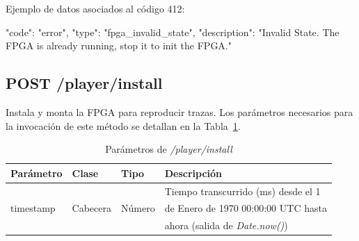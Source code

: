 \begin{itemize}
{\begin{minipage}{\textwidth}
Ejemplo de datos asociados al código 412:

\begin{code}[language=json]
{
  "code": "error",
  "type": "fpga_invalid_state",
  "description": "Invalid State. The FPGA is already running, stop it to init the FPGA."
}
\end{code}
\end{minipage}
}

\end{itemize}

%
%
\subsection{POST /player/install}
Instala y monta la \gls{FPGA} para reproducir \glspl{traza}.
Los parámetros necesarios para la invocación de este método se detallan en la Tabla~\ref{extra:api:playerinstall:invocacion}.

\begin{table}[H]
\centering
\begin{tabular}{|l|l|l|l|}
\hline
\rowcolor[HTML]{F5F5F5}
\textbf{Parámetro}  & \textbf{Clase} & \textbf{Tipo} & \textbf{Descripción}                  \\ \hline
                    &                &               & Tiempo transcurrido (ms) desde el 1   \\
timestamp           & Cabecera       & Número        & de Enero de 1970 00:00:00 UTC hasta   \\
                    &                &               & ahora (salida de \textit{Date.now()}) \\ \hline
\end{tabular}
\caption{Parámetros de \textit{/player/install}}
\label{extra:api:playerinstall:invocacion}
\end{table}

